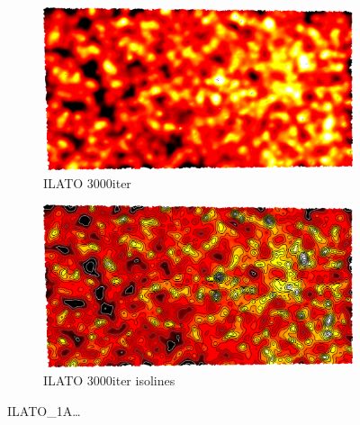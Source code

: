 \begin{figure}[ht]
{	\bigskip
	\begin{subfigure}[b]{0.48\linewidth}
		\includegraphics[width=1.0\linewidth,height=0.3\textheight,keepaspectratio]{data/acquired_meshes/ILATO_1A_SM2066-HE5-60_070214_merged_GMO_r1_n4_v256_funcvals_3000iter.png}
		\caption{ILATO 3000iter}\label{fig:ILATO.e}
	\end{subfigure}
	\begin{subfigure}[b]{0.48\linewidth}
		\includegraphics[width=1.0\linewidth,height=0.3\textheight,keepaspectratio]{data/acquired_meshes/ILATO_1A_SM2066-HE5-60_070214_merged_GMO_r1_n4_v256_funcvals_isolines_3000iter.png}
		\caption{ILATO 3000iter isolines}\label{fig:ILATO.f}
	\end{subfigure}}
	{\caption[ILATO]{ILATO\_1A\ldots}\label{fig:ILATO}}
\end{figure}

